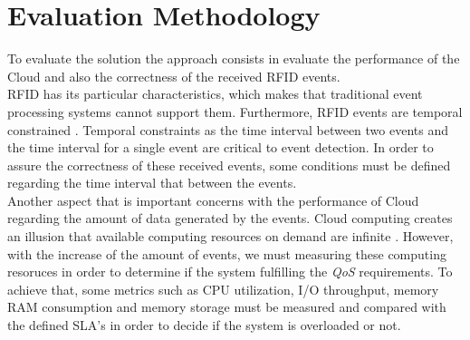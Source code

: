 \section{Evaluation Methodology}
\label{sec:evaluation}
To evaluate the solution the approach consists in evaluate the performance of the Cloud and also the correctness of
the received RFID events.\\

RFID has its particular characteristics, which makes that traditional event processing systems cannot support them. Furthermore, RFID
events are temporal constrained \cite{wang2006bridging}. Temporal constraints as the time interval between two events and the time interval
for a single event are critical to event detection. In order to assure the correctness of these received events, some conditions must be defined
regarding the time interval that between the events.\\

Another aspect that is important concerns with the performance of Cloud regarding the amount of data generated by the events. Cloud computing creates an illusion that
available computing resources on demand are infinite \cite{armbrust2009m}. However, with the increase of the amount of events, we must measuring these computing resoruces
in order to determine if the system fulfilling the \textit{QoS} requirements. To achieve that, some metrics such as CPU utilization, I/O throughput,
memory RAM consumption and memory storage must be measured and compared with the defined SLA's in order to decide if the system is overloaded or not.
